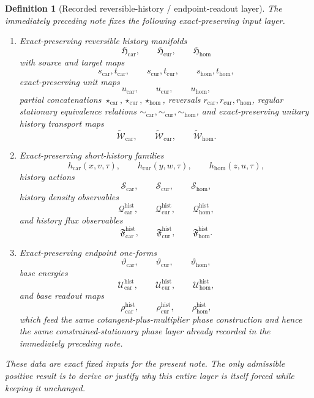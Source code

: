 \documentclass[11pt]{article}
\newcommand{\TensorHistoryClass}{\mathfrak H_{\mathrm{car}}}
\newcommand{\CurHistoryClass}{\mathfrak H_{\mathrm{cur}}}
\newcommand{\HomHistoryClass}{\mathfrak H_{\mathrm{hom}}}
\newcommand{\TensorHistoryAction}{\mathscr S_{\mathrm{car}}}
\newcommand{\CurHistoryAction}{\mathscr S_{\mathrm{cur}}}
\newcommand{\HomHistoryAction}{\mathscr S_{\mathrm{hom}}}
\newcommand{\TensorHistoryRep}{\widetilde{\mathscr W}_{\mathrm{car}}}
\newcommand{\CurHistoryRep}{\widetilde{\mathscr W}_{\mathrm{cur}}}
\newcommand{\HomHistoryRep}{\widetilde{\mathscr W}_{\mathrm{hom}}}
\newtheorem{definition}{Definition}
\begin{document}
\begin{definition}[Recorded reversible-history / endpoint-readout layer]
\label{def:recorded_layer}
The immediately preceding note fixes the following exact-preserving input layer.
\begin{enumerate}
    \item Exact-preserving reversible history manifolds
    \[
    \TensorHistoryClass,\qquad
    \CurHistoryClass,\qquad
    \HomHistoryClass
    \]
    with source and target maps
    \[
    s_{\mathrm{car}},t_{\mathrm{car}},\qquad
    s_{\mathrm{cur}},t_{\mathrm{cur}},\qquad
    s_{\mathrm{hom}},t_{\mathrm{hom}},
    \]
    exact-preserving unit maps
    \[
    u_{\mathrm{car}},\qquad
    u_{\mathrm{cur}},\qquad
    u_{\mathrm{hom}},
    \]
    partial concatenations \(\star_{\mathrm{car}},\star_{\mathrm{cur}},\star_{\mathrm{hom}}\), reversals \(r_{\mathrm{car}},r_{\mathrm{cur}},r_{\mathrm{hom}}\), regular stationary equivalence relations \(\sim_{\mathrm{car}},\sim_{\mathrm{cur}},\sim_{\mathrm{hom}}\), and exact-preserving unitary history transport maps
    \[
    \TensorHistoryRep,\qquad
    \CurHistoryRep,\qquad
    \HomHistoryRep.
    \]
    \item Exact-preserving short-history families
    \[
    h_{\mathrm{car}}(x,v,\tau),\qquad
    h_{\mathrm{cur}}(y,w,\tau),\qquad
    h_{\mathrm{hom}}(z,u,\tau),
    \]
    history actions
    \[
    \TensorHistoryAction,\qquad
    \CurHistoryAction,\qquad
    \HomHistoryAction,
    \]
    history density observables
    \[
    \mathcal Q_{\mathrm{car}}^{\mathrm{hist}},\qquad
    \mathcal Q_{\mathrm{cur}}^{\mathrm{hist}},\qquad
    \mathcal Q_{\mathrm{hom}}^{\mathrm{hist}},
    \]
    and history flux observables
    \[
    \mathfrak F_{\mathrm{car}}^{\mathrm{hist}},\qquad
    \mathfrak F_{\mathrm{cur}}^{\mathrm{hist}},\qquad
    \mathfrak F_{\mathrm{hom}}^{\mathrm{hist}}.
    \]
    \item Exact-preserving endpoint one-forms
    \[
    \vartheta_{\mathrm{car}},\qquad
    \vartheta_{\mathrm{cur}},\qquad
    \vartheta_{\mathrm{hom}},
    \]
    base energies
    \[
    \mathcal U_{\mathrm{car}}^{\mathrm{hist}},\qquad
    \mathcal U_{\mathrm{cur}}^{\mathrm{hist}},\qquad
    \mathcal U_{\mathrm{hom}}^{\mathrm{hist}},
    \]
    and base readout maps
    \[
    \rho_{\mathrm{car}}^{\mathrm{hist}},\qquad
    \rho_{\mathrm{cur}}^{\mathrm{hist}},\qquad
    \rho_{\mathrm{hom}}^{\mathrm{hist}},
    \]
    which feed the same cotangent-plus-multiplier phase construction and hence the same constrained-stationary phase layer already recorded in the immediately preceding note.
\end{enumerate}
These data are exact fixed inputs for the present note. The only admissible positive result is to derive or justify why this entire layer is itself forced while keeping it unchanged.
\end{definition}
\end{document}
